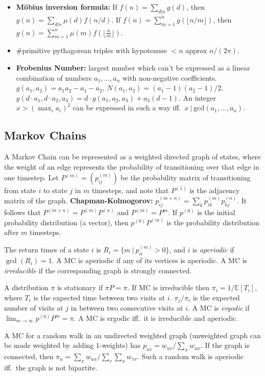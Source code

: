 \documentclass[12pt,a4paper,landscape]{amsart}
\begin{document}
\begin{multicols*}{3}
\begin{itemize}
	\item \textbf{Möbius inversion formula:} If $f(n) = \sum_{d|n} g(d)$, then $g(n) = \sum_{d|n} \mu(d) f(n/d)$. If $f(n) = \sum_{m=1}^n g(\lfloor n/m\rfloor)$, then $g(n) = \sum_{m=1}^n \mu(m)f(\lfloor\frac{n}{m}\rfloor)$.
	\item \#primitive pythagorean triples with hypotenuse $<n$ approx $n/(2\pi)$.
	\item \textbf{Frobenius Number:} largest number which can't be
	expressed as a linear combination of numbers $a_1,\ldots,a_n$
	with non-negative coefficients. $g(a_1,a_2) = a_1a_2-a_1-a_2$,
	$N(a_1,a_2)=(a_1-1)(a_2-1)/2$. $g(d\cdot a_1,d\cdot a_2,a_3) =
	d\cdot g(a_1,a_2,a_3) + a_3(d-1)$. An integer $x>\left(\max_i
	a_i\right)^2$ can be expressed in such a way iff.\ $x\ |\
	\mathrm{gcd}(a_1,\ldots,a_n)$.
\end{itemize}

\subsection{Markov Chains}
A Markov Chain can be represented as a weighted directed graph of
states, where the weight of an edge represents the probability of
transitioning over that edge in one timestep. Let $P^{(m)} = (p^{(m)}_{ij})$
be the probability matrix of transitioning from state $i$ to state $j$
in $m$ timesteps, and note that $P^{(1)}$ is the adjacency matrix of
the graph. \textbf{Chapman-Kolmogorov:} $p^{(m+n)}_{ij} = \sum_{k}
p^{(m)}_{ik} p^{(n)}_{kj}$. It follows that $P^{(m+n)} =
P^{(m)}P^{(n)}$ and $P^{(m)} = P^m$. If $p^{(0)}$ is the initial
probability distribution (a vector), then $p^{(0)}P^{(m)}$ is the
probability distribution after $m$ timesteps.

The return times of a state $i$ is $R_i = \{m\ |\ p^{(m)}_{ii} > 0 \}$,
and $i$ is \textit{aperiodic} if $\gcd(R_i) = 1$. A MC is aperiodic if
any of its vertices is aperiodic. A MC is \textit{irreducible} if the
corresponding graph is strongly connected.

A distribution $\pi$ is stationary if $\pi P = \pi$. If MC is
irreducible then $\pi_i = 1/\mathbb{E}[T_i]$, where $T_i$ is the
expected time between two visits at $i$. $\pi_j/\pi_i$ is the expected
number of visits at $j$ in between two consecutive visits at $i$. A MC
is \textit{ergodic} if $\lim_{m\to\infty} p^{(0)} P^{m} = \pi$. A MC is
ergodic iff.\ it is irreducible and aperiodic.

A MC for a random walk in an undirected weighted graph (unweighted
graph can be made weighted by adding $1$-weights) has $p_{uv} =
w_{uv}/\sum_{x} w_{ux}$. If the graph is connected, then $\pi_u =
\sum_{x} w_{ux} / \sum_{v}\sum_{x} w_{vx}$. Such a random walk is
aperiodic iff.\ the graph is not bipartite.


\end{multicols*}
\end{document}
